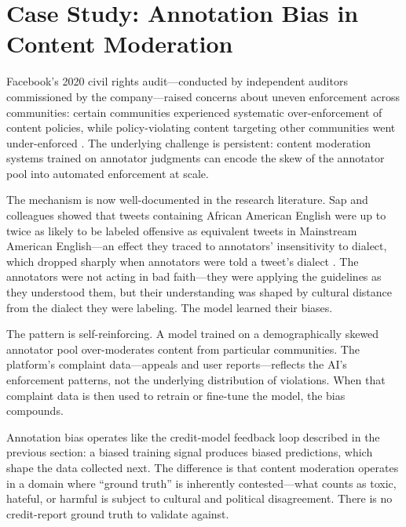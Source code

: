 \section{Case Study: Annotation Bias in Content Moderation}
\label{sec:political-speech}

Facebook's 2020 civil rights audit---conducted by independent auditors commissioned by the company---raised concerns about uneven enforcement across communities: certain communities experienced systematic over-enforcement of content policies, while policy-violating content targeting other communities went under-enforced \autocite{meta2020audit}. The underlying challenge is persistent: content moderation systems trained on annotator judgments can encode the skew of the annotator pool into automated enforcement at scale.

The mechanism is now well-documented in the research literature. Sap and colleagues showed that tweets containing African American English were up to twice as likely to be labeled offensive as equivalent tweets in Mainstream American English---an effect they traced to annotators' insensitivity to dialect, which dropped sharply when annotators were told a tweet's dialect \autocite{sap2019risk}. The annotators were not acting in bad faith---they were applying the guidelines as they understood them, but their understanding was shaped by cultural distance from the dialect they were labeling. The model learned their biases.

The pattern is self-reinforcing. A model trained on a demographically skewed annotator pool over-moderates content from particular communities. The platform's complaint data---appeals and user reports---reflects the AI's enforcement patterns, not the underlying distribution of violations. When that complaint data is then used to retrain or fine-tune the model, the bias compounds.

\begin{examplebox}
Annotation bias operates like the credit-model feedback loop described in the previous section: a biased training signal produces biased predictions, which shape the data collected next. The difference is that content moderation operates in a domain where ``ground truth'' is inherently contested---what counts as toxic, hateful, or harmful is subject to cultural and political disagreement. There is no credit-report ground truth to validate against.
\end{examplebox}

